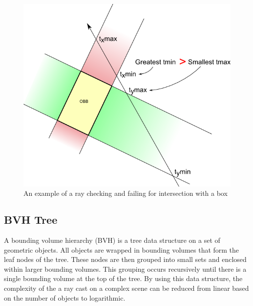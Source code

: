 \documentclass[12pt]{report}
\begin{document}
\begin{figure}
\includegraphics{AABBray}
\caption{An example of a ray checking and failing for intersection with a box}
\end{figure}

\subsection{BVH Tree}
 A bounding volume hierarchy (BVH) is a tree data structure on a set of geometric objects.
 All objects are wrapped in bounding volumes that form the leaf nodes of the tree.
 These nodes are then grouped into small sets and enclosed within larger bounding volumes.
 This grouping occurs recursively until there is a single bounding volume at the top of the tree.
 By using this data structure, the complexity of the a ray cast on a complex scene can be reduced from linear based on the number of objects to logarithmic.
 
\end{document}
